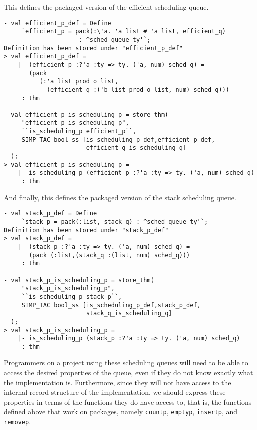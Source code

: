 This defines the packaged version of the efficient scheduling
queue.
\begin{session}
\begin{verbatim}
- val efficient_p_def = Define
     `efficient_p = pack(:\'a. 'a list # 'a list, efficient_q)
                     : ^sched_queue_ty'`;
Definition has been stored under "efficient_p_def"
> val efficient_p_def =
    |- (efficient_p :?'a :ty => ty. ('a, num) sched_q) =
       (pack
          (:'a list prod o list,
            (efficient_q :('b list prod o list, num) sched_q)))
     : thm
                     
- val efficient_p_is_scheduling_p = store_thm(
     "efficient_p_is_scheduling_p",
     ``is_scheduling_p efficient_p``,
     SIMP_TAC bool_ss [is_scheduling_p_def,efficient_p_def,
                       efficient_q_is_scheduling_q]
  );
> val efficient_p_is_scheduling_p =
    |- is_scheduling_p (efficient_p :?'a :ty => ty. ('a, num) sched_q)
     : thm
\end{verbatim}
\end{session}

And finally, this defines the packaged version of the stack
scheduling queue.
\begin{session}
\begin{verbatim}
- val stack_p_def = Define
     `stack_p = pack(:list, stack_q) : ^sched_queue_ty'`;
Definition has been stored under "stack_p_def"
> val stack_p_def =
    |- (stack_p :?'a :ty => ty. ('a, num) sched_q) =
       (pack (:list,(stack_q :(list, num) sched_q)))
     : thm

- val stack_p_is_scheduling_p = store_thm(
     "stack_p_is_scheduling_p",
     ``is_scheduling_p stack_p``,
     SIMP_TAC bool_ss [is_scheduling_p_def,stack_p_def,
                       stack_q_is_scheduling_q]
  );
> val stack_p_is_scheduling_p =
    |- is_scheduling_p (stack_p :?'a :ty => ty. ('a, num) sched_q)
     : thm
\end{verbatim}
\end{session}

Programmers on a project using these scheduling queues will need
to be able to access the desired properties of the queue, even if 
they do not know exactly what the implementation is. 
Furthermore, since they will not have access to the internal
record structure of the implementation, we should express these 
properties in terms of the functions they do have access to,
that is, the functions defined above that work on packages, 
namely {\tt countp}, {\tt emptyp}, {\tt insertp}, and {\tt removep}.

